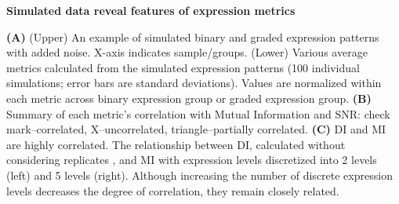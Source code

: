 \textbf{Simulated data reveal features of expression metrics}

\textbf{(A)} (Upper) An example of simulated binary and graded expression patterns with added noise. X-axis indicates sample/groups. (Lower) Various average metrics calculated from the simulated expression patterns (100 individual simulations; error bars are standard deviations). Values are normalized within each metric across binary expression group or graded expression group. 
\textbf{(B)} Summary of each metric's correlation with Mutual Information and SNR: check mark--correlated, X--uncorrelated, triangle--partially correlated.
\textbf{(C)} DI and MI are highly correlated. The relationship between DI, calculated without considering replicates%
, and MI with expression levels discretized into 2 levels (left) and 5 levels (right). Although increasing the number of discrete expression levels decreases the degree of correlation, they remain closely related.

